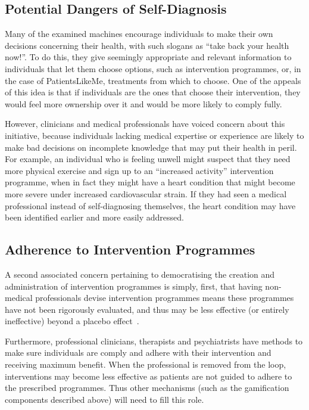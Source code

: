 \documentclass{sig-alternate}
\begin{document}
\subsection{Potential Dangers of Self-Diagnosis}

Many of the examined machines encourage individuals to make their own
decisions concerning their health, with such slogans as ``take back
your health now!''.  To do this, they give seemingly appropriate and
relevant information to individuals that let them choose options, such
as intervention programmes, or, in the case of PatientsLikeMe,
treatments from which to choose.  One of the appeals of this idea is
that if individuals are the ones that choose their intervention, they
would feel more ownership over it and would be more likely to comply
fully.

However, clinicians and medical professionals have voiced concern
about this initiative, because individuals lacking medical expertise or
experience are likely to make bad decisions on incomplete knowledge
that may put their health in peril.  For example, an individual who is
feeling unwell might suspect that they need more physical exercise and
sign up to an ``increased activity'' intervention programme, when in
fact they might have a heart condition that might become more severe
under increased cardiovascular strain.  If they had seen a medical
professional instead of self-diagnosing themselves, the heart
condition may have been identified earlier and more easily addressed.

\subsection{Adherence to Intervention Programmes}

A second associated concern pertaining to democratising the creation
and administration of intervention programmes is simply, first, that
having non-medical professionals devise intervention programmes means
these programmes have not been rigorously evaluated, and thus may be
less effective (or entirely ineffective) beyond a placebo effect~\cite{placeboeffect}.  

Furthermore, professional clinicians, therapists and psychiatrists
have methods to make sure individuals are comply and adhere with their
intervention and receiving maximum benefit.  When the professional is
removed from the loop, interventions may become less effective as
patients are not guided to adhere to the prescribed programmes. Thus
other mechanisms (such as the gamification components described above)
will need to fill this role.
\end{document}
